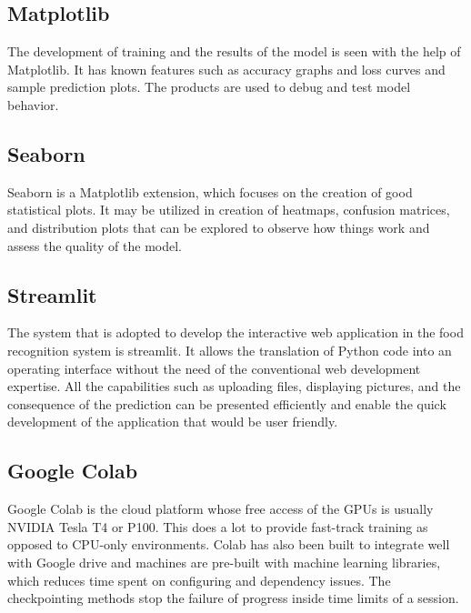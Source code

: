 \documentclass[12pt, openany]{report}
\begin{document}
\subsection{Matplotlib}
The development of training and the results of the model is seen with the help of Matplotlib. It has known features such as accuracy graphs and loss curves and sample prediction plots. The products are used to debug and test model behavior.
\subsection{Seaborn}
Seaborn is a Matplotlib extension, which focuses on the creation of good statistical plots. It may be utilized in creation of heatmaps, confusion matrices, and distribution plots that can be explored to observe how things work and assess the quality of the model.
\subsection{Streamlit}
The system that is adopted to develop the interactive web application in the food recognition system is streamlit. It allows the translation of Python code into an operating interface without the need of the conventional web development expertise. All the capabilities such as uploading files, displaying pictures, and the consequence of the prediction can be presented efficiently and enable the quick development of the application that would be user friendly.
\subsection{Google Colab}
Google Colab is the cloud platform whose free access of the GPUs is usually NVIDIA Tesla T4 or P100. This does a lot to provide fast-track training as opposed to CPU-only environments. Colab has also been built to integrate well with Google drive and machines are pre-built with machine learning libraries, which reduces time spent on configuring and dependency issues. The checkpointing methods stop the failure of progress inside time limits of a session.
\end{document}
